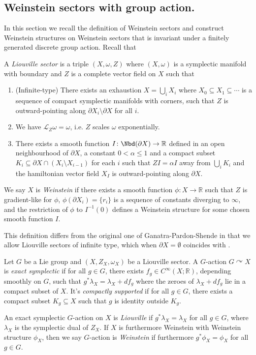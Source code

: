 \subsection{Weinstein sectors with group action.} In this section we recall the definition of Weinstein sectors and construct Weinstein structures on Weinstein sectors that is invariant under a finitely generated discrete group action. Recall that
\begin{dfn}\label{defn:Liouville-sector-inf}
    A \emph{Liouville sector} is a triple $(X,\omega,Z)$ where $(X,\omega)$ is a symplectic manifold with boundary and $Z$ is a complete vector field on $X$ such that 
    \begin{enumerate}[\indent (i)]
        \item (Infinite-type) There exists an exhaustion $X=\displaystyle\bigcup_i X_i$ where $X_0\subseteq X_1\subseteq\dotsb$ is a sequence of compact symplectic manifolds with corners, such that $Z$ is outward-pointing along $\partial X_i\setminus\partial X$ for all $i$.
        \item We have $\mathcal{L}_Z\omega =\omega$, i.e. $Z$ scales $\omega$ exponentially.
        \item There exists a smooth function $I\colon\Nbd (\partial X)\to\mathbb{R}$ defined in an open neighbourhood of $\partial X$, a constant $0<\alpha\leq 1$ and a compact subset $K_i\subseteq\partial X\cap (X_i\setminus X_{i-1})$ for each $i$ such that $ZI=\alpha I$ away from $\displaystyle\bigcup_i K_i$ and the hamiltonian vector field $X_I$ is outward-pointing along $\partial X$.
    \end{enumerate}
    We say $X$ is \emph{Weinstein} if there exists a smooth function $\phi\colon X\to\mathbb{R}$ such that $Z$ is gradient-like for $\phi$, $\phi(\partial X_i)=\{r_i\}$ is a sequence of constants diverging to $\infty$, and the restriction of $\phi$ to $I^{-1}(0)$ defines a Weinstein structure for some chosen smooth function $I$.
\end{dfn}
This definition differs from the original one of Ganatra-Pardon-Shende \cite{GPS20} in that we allow Liouville sectors of infinite type, which when $\partial X=\emptyset$ coincides with \cite{CE12}.
\begin{dfn}\label{defn:G-invariant-Weinstein-sector}
    Let $G$ be a Lie group and $(X,Z_X,\omega_X)$ be a Liouville sector. A $G$-action $G\curvearrowright X$ is \emph{exact symplectic} if for all $g\in G$, there exists $f_g\in C^{\infty} (X;\mathbb{R})$, depending smoothly on $G$, such that $g^{\ast}\lambda_X =\lambda_X +df_g$ where the zeroes of $\lambda_X +df_g$ lie in a compact subset of $X$. It's \emph{compactly supported} if for all $g\in G$, there exists a compact subset $K_g\subseteq X$ such that $g$ is identity outside $K_g$.\par
    An exact symplectic $G$-action on $X$ is \emph{Liouville} if $g^{\ast}\lambda_X =\lambda_X$ for all $g\in G$, where $\lambda_X$ is the symplectic dual of $Z_X$. If $X$ is furthermore Weinstein with Weinstein structure $\phi_X$, then we say $G$-action is \emph{Weinstein} if furthermore $g^{\ast}\phi_X =\phi_X$ for all $g\in G$.
\end{dfn}
